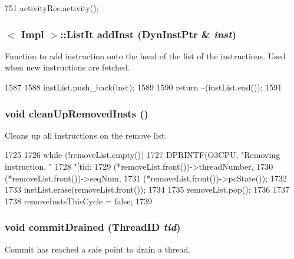 \begin{DoxyCode}
751 { activityRec.activity(); }
\end{DoxyCode}
\hypertarget{classFullO3CPU_ac6e8e55d456fb0d761c64063087d298a}{
\subsubsection[{addInst}]{$<$ Impl $>$::{\bf ListIt} addInst ({\bf DynInstPtr} \& {\em inst})}}
\label{classFullO3CPU_ac6e8e55d456fb0d761c64063087d298a}
Function to add instruction onto the head of the list of the instructions. Used when new instructions are fetched. 


\begin{DoxyCode}
1587 {
1588     instList.push_back(inst);
1589 
1590     return --(instList.end());
1591 }
\end{DoxyCode}
\hypertarget{classFullO3CPU_a7bc351a2a79efb6dc9f88f8a6a2ed33c}{
\subsubsection[{cleanUpRemovedInsts}]{\setlength{\rightskip}{0pt plus 5cm}void cleanUpRemovedInsts ()}}
\label{classFullO3CPU_a7bc351a2a79efb6dc9f88f8a6a2ed33c}
Cleans up all instructions on the remove list. 


\begin{DoxyCode}
1725 {
1726     while (!removeList.empty()) {
1727         DPRINTF(O3CPU, "Removing instruction, "
1728                 "[tid:%
1729                 (*removeList.front())->threadNumber,
1730                 (*removeList.front())->seqNum,
1731                 (*removeList.front())->pcState());
1732 
1733         instList.erase(removeList.front());
1734 
1735         removeList.pop();
1736     }
1737 
1738     removeInstsThisCycle = false;
1739 }
\end{DoxyCode}
\hypertarget{classFullO3CPU_a07a52466ac4d8d91cbfb73b9ceb42988}{
\subsubsection[{commitDrained}]{\setlength{\rightskip}{0pt plus 5cm}void commitDrained ({\bf ThreadID} {\em tid})}}
\label{classFullO3CPU_a07a52466ac4d8d91cbfb73b9ceb42988}
Commit has reached a safe point to drain a thread.

